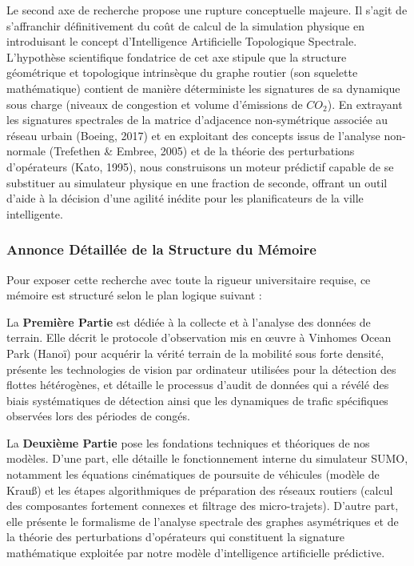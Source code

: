 \documentclass[10pt, a4paper]{article}
\begin{document}
Le second axe de recherche propose une rupture conceptuelle majeure. Il
s'agit de s'affranchir définitivement du coût de calcul de la simulation
physique en introduisant le concept d'Intelligence Artificielle
Topologique Spectrale. L'hypothèse scientifique fondatrice de cet axe
stipule que la structure géométrique et topologique intrinsèque du
graphe routier (son squelette mathématique) contient de manière
déterministe les signatures de sa dynamique sous charge (niveaux de
congestion et volume d'émissions de \(CO_2\)). En extrayant les
signatures spectrales de la matrice d'adjacence non-symétrique associée
au réseau urbain (Boeing, 2017) et en exploitant des concepts issus de
l'analyse non-normale (Trefethen \& Embree, 2005) et de la théorie des
perturbations d'opérateurs (Kato, 1995), nous construisons un moteur
prédictif capable de se substituer au simulateur physique en une
fraction de seconde, offrant un outil d'aide à la décision d'une agilité
inédite pour les planificateurs de la ville intelligente.

\subsubsection{Annonce Détaillée de la Structure du
Mémoire}\label{annonce-duxe9tailluxe9e-de-la-structure-du-muxe9moire}

Pour exposer cette recherche avec toute la rigueur universitaire
requise, ce mémoire est structuré selon le plan logique suivant :

La \textbf{Première Partie} est dédiée à la collecte et à l'analyse des
données de terrain. Elle décrit le protocole d'observation mis en œuvre
à Vinhomes Ocean Park (Hanoï) pour acquérir la vérité terrain de la
mobilité sous forte densité, présente les technologies de vision par
ordinateur utilisées pour la détection des flottes hétérogènes, et
détaille le processus d'audit de données qui a révélé des biais
systématiques de détection ainsi que les dynamiques de trafic
spécifiques observées lors des périodes de congés.

La \textbf{Deuxième Partie} pose les fondations techniques et théoriques
de nos modèles. D'une part, elle détaille le fonctionnement interne du
simulateur SUMO, notamment les équations cinématiques de poursuite de
véhicules (modèle de Krauß) et les étapes algorithmiques de préparation
des réseaux routiers (calcul des composantes fortement connexes et
filtrage des micro-trajets). D'autre part, elle présente le formalisme
de l'analyse spectrale des graphes asymétriques et de la théorie des
perturbations d'opérateurs qui constituent la signature mathématique
exploitée par notre modèle d'intelligence artificielle prédictive.
\end{document}
